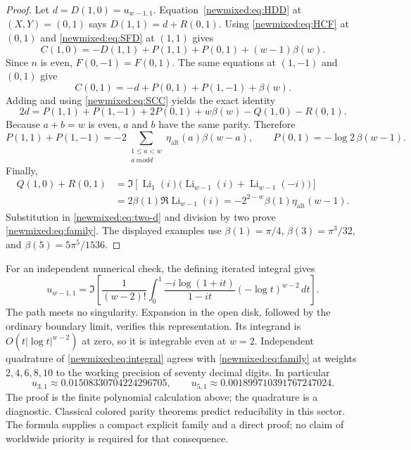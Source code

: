 \begin{proof}
Let $d=D(1,0)=u_{w-1,1}$.  Equation~\eqref{newmixed:eq:HDD} at
$(X,Y)=(0,1)$ says $D(1,1)=d+R(0,1)$.  Using
\eqref{newmixed:eq:HCF} at $(0,1)$ and
\eqref{newmixed:eq:SFD} at $(1,1)$ gives
\[
 C(1,0)=-D(1,1)+P(1,1)+P(0,1)+(w-1)\beta(w).
\]
Since $n$ is even, $F(0,-1)=F(0,1)$.  The same equations at
$(1,-1)$ and $(0,1)$ give
\[
 C(0,1)=-d+P(0,1)+P(1,-1)+\beta(w).
\]
Adding and using \eqref{newmixed:eq:SCC} yields the exact identity
\begin{equation}\label{newmixed:eq:two-d}
 2d=P(1,1)+P(1,-1)+2P(0,1)+w\beta(w)-Q(1,0)-R(0,1).
\end{equation}
Because $a+b=w$ is even, $a$ and $b$ have the same parity.  Therefore
\[
 P(1,1)+P(1,-1)
 =-2\sum_{\substack{1\le a<w\\a\ {
m odd}}}\eta_{\mathrm{alt}}(a)\beta(w-a),
 \qquad P(0,1)=-\log2\,\beta(w-1).
\]
Finally,
\begin{align*}
 Q(1,0)+R(0,1)
 &=\Im\left[\operatorname{Li}_1(i)
       \bigl(\operatorname{Li}_{w-1}(i)
             +\operatorname{Li}_{w-1}(-i)\bigr)\right]\\
 &=2\beta(1)\Re\operatorname{Li}_{w-1}(i)
 =-2^{2-w}\beta(1)\eta_{\mathrm{alt}}(w-1).
\end{align*}
Substitution in \eqref{newmixed:eq:two-d} and division by two prove
\eqref{newmixed:eq:family}.  The displayed examples use
$\beta(1)=\pi/4$, $\beta(3)=\pi^3/32$, and
$\beta(5)=5\pi^5/1536$.
\end{proof}

For an independent numerical check, the defining iterated integral gives
\begin{equation}\label{newmixed:eq:integral}
 u_{w-1,1}=\Im\left[
 \frac1{(w-2)!}\int_0^1
 \frac{-i\log(1+it)}{1-it}(-\log t)^{w-2}\,dt\right].
\end{equation}
The path meets no singularity.  Expansion in the open disk, followed
by the ordinary boundary limit, verifies this representation.  Its
integrand is $O(t|\log t|^{w-2})$ at zero, so it is integrable even
at $w=2$.  Independent quadrature of \eqref{newmixed:eq:integral}
agrees with \eqref{newmixed:eq:family} at weights $2,4,6,8,10$ to the
working precision of seventy decimal digits.  In particular
\[
 u_{3,1}\approx0.01508330704224296705,
 \qquad u_{5,1}\approx0.001899710391767247024.
\]
The proof is the finite polynomial calculation above; the quadrature is
a diagnostic.  Classical colored parity theorems predict reducibility
in this sector.  The formula supplies a compact explicit family and
a direct proof; no claim of worldwide priority is required for that
consequence.

